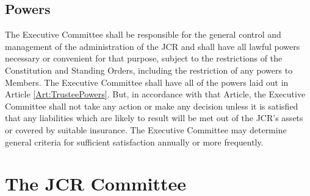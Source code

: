 \subsection{Powers}
\npara The Executive Committee shall be responsible for the general control and management of the administration of the JCR and shall have all lawful powers necessary or convenient for that purpose, subject to the restrictions of the Constitution and Standing Orders, including the restriction of any powers to Members.
\npara The Executive Committee shall have all of the powers laid out in Article \ref{Art:TrusteePowers}.
But, in accordance with that Article, the Executive Committee shall not take any action or make any decision unless it is satisfied that any liabilities which are likely to result will be met out of the JCR's assets or covered by suitable insurance.
The Executive Committee may determine general criteria for sufficient satisfaction annually or more frequently.
\section{The JCR Committee}
